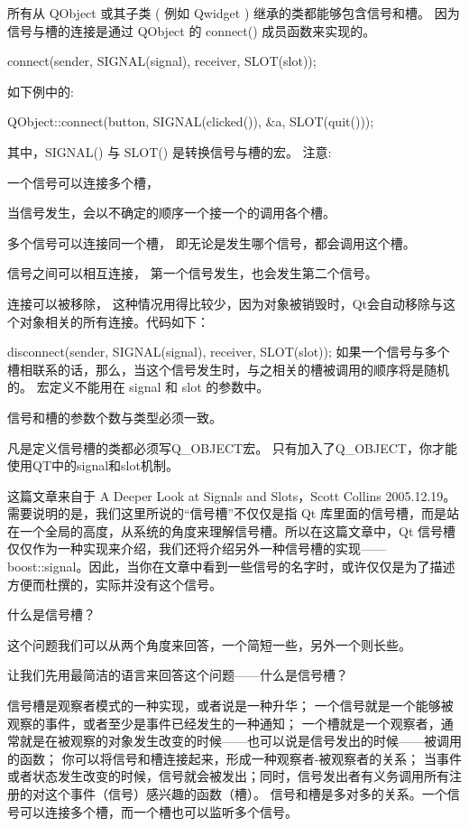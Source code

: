 所有从 QObject 或其子类 ( 例如 Qwidget ) 继承的类都能够包含信号和槽。
因为信号与槽的连接是通过 QObject 的 connect() 成员函数来实现的。

connect(sender, SIGNAL(signal), receiver, SLOT(slot));


如下例中的:

QObject::connect(button, SIGNAL(clicked()), \&a, SLOT(quit()));

其中，SIGNAL() 与 SLOT() 是转换信号与槽的宏。
注意:

一个信号可以连接多个槽，

当信号发生，会以不确定的顺序一个接一个的调用各个槽。

多个信号可以连接同一个槽，
即无论是发生哪个信号，都会调用这个槽。

信号之间可以相互连接，
第一个信号发生，也会发生第二个信号。

连接可以被移除，
这种情况用得比较少，因为对象被销毁时，Qt会自动移除与这个对象相关的所有连接。代码如下：

disconnect(sender, SIGNAL(signal), receiver, SLOT(slot));
如果一个信号与多个槽相联系的话，那么，当这个信号发生时，与之相关的槽被调用的顺序将是随机的。
宏定义不能用在 signal 和 slot 的参数中。

信号和槽的参数个数与类型必须一致。

凡是定义信号槽的类都必须写Q\_OBJECT宏。
只有加入了Q\_OBJECT，你才能使用QT中的signal和slot机制。

这篇文章来自于 A Deeper Look at Signals and Slots，Scott Collins 2005.12.19。需要说明的是，我们这里所说的“信号槽”不仅仅是指 Qt 库里面的信号槽，而是站在一个全局的高度，从系统的角度来理解信号槽。所以在这篇文章中，Qt 信号槽仅仅作为一种实现来介绍，我们还将介绍另外一种信号槽的实现——boost::signal。因此，当你在文章中看到一些信号的名字时，或许仅仅是为了描述方便而杜撰的，实际并没有这个信号。

什么是信号槽？

这个问题我们可以从两个角度来回答，一个简短一些，另外一个则长些。

让我们先用最简洁的语言来回答这个问题——什么是信号槽？

信号槽是观察者模式的一种实现，或者说是一种升华；
一个信号就是一个能够被观察的事件，或者至少是事件已经发生的一种通知；
一个槽就是一个观察者，通常就是在被观察的对象发生改变的时候——也可以说是信号发出的时候——被调用的函数；
你可以将信号和槽连接起来，形成一种观察者-被观察者的关系；
当事件或者状态发生改变的时候，信号就会被发出；同时，信号发出者有义务调用所有注册的对这个事件（信号）感兴趣的函数（槽）。
信号和槽是多对多的关系。一个信号可以连接多个槽，而一个槽也可以监听多个信号。

